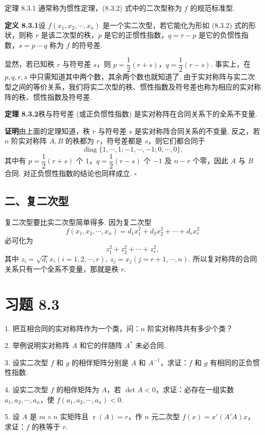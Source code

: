 \documentclass[UTF8, 12pt, fontset=fandol, oneside]{ctexart}
\begin{document}
定理 8.3.1 通常称为惯性定理，(8.3.2) 式中的二次型称为 $f$ 的规范标准型.

\noindent\textbf{定义 8.3.1}\quad 设 $f(x_1,x_2,\cdots,x_n)$ 是一个实二次型，若它能化为形如 (8.3.2) 式的形状，则称 $r$ 是该二次型的秩，$p$ 是它的正惯性指数，$q=r-p$ 是它的负惯性指数，$s=p-q$ 称为 $f$ 的符号差.

显然，若已知秩 $r$ 与符号差 $s$，则 $p=\dfrac12(r+s)$，$q=\dfrac12(r-s)$. 事实上，在 $p,q,r,s$ 中只需知道其中两个数，其余两个数也就知道了. 由于实对称阵与实二次型之间的等价关系，我们将实二次型的秩、惯性指数及符号差也称为相应的实对称阵的秩、惯性指数及符号差.

\noindent\textbf{定理 8.3.2}\quad 秩与符号差 (或正负惯性指数) 是实对称阵在合同关系下的全系不变量.

\noindent\textbf{证明}\quad 由上面的定理知道，秩 $r$ 与符号差 $s$ 是实对称阵合同关系的不变量. 反之，若 $n$ 阶实对称阵 $A,B$ 的秩都为 $r$，符号差都是 $s$，则它们都合同于
\[
\operatorname{diag}\{1,\cdots,1;-1,\cdots,-1;0,\cdots,0\},
\]
其中有 $p=\dfrac12(r+s)$ 个 $1$，$q=\dfrac12(r-s)$ 个 $-1$ 及 $n-r$ 个零，因此 $A$ 与 $B$ 合同. 对正负惯性指数的结论也同样成立. $\square$

\subsection*{二、复二次型}

复二次型要比实二次型简单得多. 因为复二次型
\[
f(x_1,x_2,\cdots,x_n)=d_1x_1^2+d_2x_2^2+\cdots+d_rx_r^2
\]
必可化为
\[
z_1^2+z_2^2+\cdots+z_r^2,
\]
其中 $z_i=\sqrt{d_i}x_i(i=1,2,\cdots,r),\ z_j=x_j(j=r+1,\cdots,n)$. 所以复对称阵的合同关系只有一个全系不变量，那就是秩 $r$.

\section*{习题 8.3}

1. 把互相合同的实对称阵作为一个类，问：$n$ 阶实对称阵共有多少个类？

2. 举例说明实对称阵 $A$ 和它的伴随阵 $A^*$ 未必合同.

3. 设实二次型 $f$ 和 $g$ 的相伴矩阵分别是 $A$ 和 $A^{-1}$，求证：$f$ 和 $g$ 有相同的正负惯性指数.

4. 设实二次型 $f$ 的相伴矩阵为 $A$，若 $\det A<0$，求证：必存在一组实数 $a_1,a_2,\cdots,a_n$，使 $f(a_1,a_2,\cdots,a_n)<0$.

5. 设 $A$ 是 $m\times n$ 实矩阵且 $\operatorname{r}(A)=r$，作 $n$ 元二次型 $f(x)=x'(A'A)x$，求证：$f$ 的秩等于 $r$.
\end{document}
